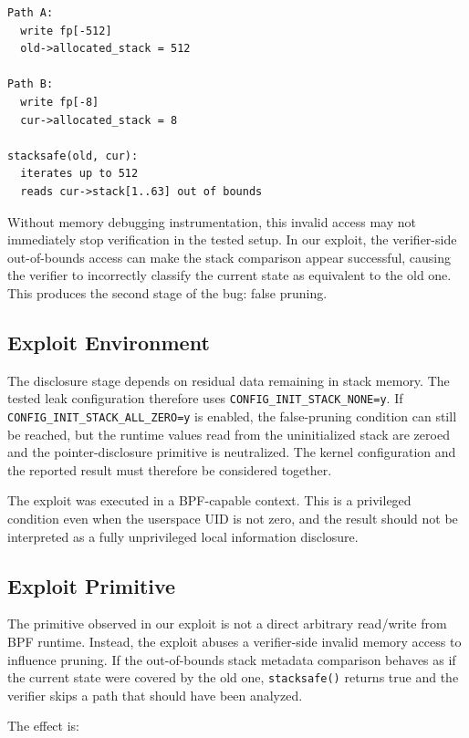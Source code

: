 \documentclass[../main.tex]{subfiles}
\begin{document}
\begin{lstlisting}[caption={Stack-depth mismatch causing the bug.}]
Path A:
  write fp[-512]
  old->allocated_stack = 512

Path B:
  write fp[-8]
  cur->allocated_stack = 8

stacksafe(old, cur):
  iterates up to 512
  reads cur->stack[1..63] out of bounds
\end{lstlisting}

Without memory debugging instrumentation, this invalid access may not immediately stop verification in the tested setup. In our exploit, the verifier-side out-of-bounds access can make the stack comparison appear successful, causing the verifier to incorrectly classify the current state as equivalent to the old one. This produces the second stage of the bug: false pruning.

\subsection{Exploit Environment}

The disclosure stage depends on residual data remaining in stack memory. The tested leak configuration therefore uses \texttt{CONFIG\_INIT\_STACK\_NONE=y}. If \texttt{CONFIG\_INIT\_STACK\_ALL\_ZERO=y} is enabled, the false-pruning condition can still be reached, but the runtime values read from the uninitialized stack are zeroed and the pointer-disclosure primitive is neutralized. The kernel configuration and the reported result must therefore be considered together.

The exploit was executed in a BPF-capable context. This is a privileged condition even when the userspace UID is not zero, and the result should not be interpreted as a fully unprivileged local information disclosure.

\subsection{Exploit Primitive}

The primitive observed in our exploit is not a direct arbitrary read/write from BPF runtime. Instead, the exploit abuses a verifier-side invalid memory access to influence pruning. If the out-of-bounds stack metadata comparison behaves as if the current state were covered by the old one, \texttt{stacksafe()} returns true and the verifier skips a path that should have been analyzed.

The effect is:
\end{document}
